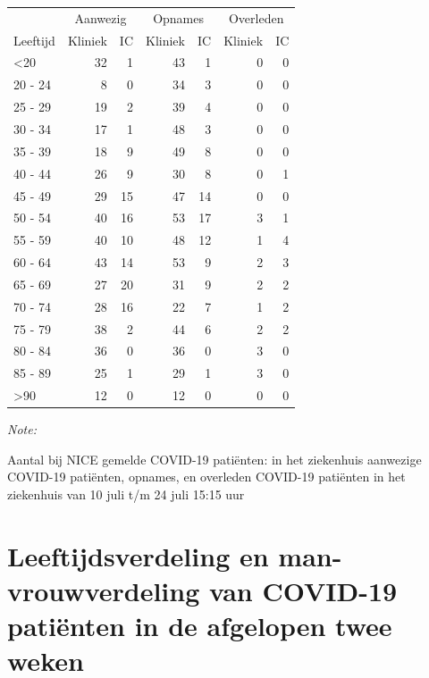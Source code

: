 \documentclass[
  english,
  man,floatsintext]{apa6}
\begin{document}
\begin{table}
\centering\begingroup\fontsize{10}{12}\selectfont

\begin{threeparttable}
\begin{tabular}{lrrrrrr}
\toprule
\multicolumn{1}{c}{ } & \multicolumn{2}{c}{Aanwezig} & \multicolumn{2}{c}{Opnames} & \multicolumn{2}{c}{Overleden} \\
\cmidrule(l{3pt}r{3pt}){2-3} \cmidrule(l{3pt}r{3pt}){4-5} \cmidrule(l{3pt}r{3pt}){6-7}
Leeftijd & Kliniek & IC & Kliniek & IC & Kliniek & IC\\
\midrule
<20 & 32 & 1 & 43 & 1 & 0 & 0\\
20 - 24 & 8 & 0 & 34 & 3 & 0 & 0\\
25 - 29 & 19 & 2 & 39 & 4 & 0 & 0\\
30 - 34 & 17 & 1 & 48 & 3 & 0 & 0\\
35 - 39 & 18 & 9 & 49 & 8 & 0 & 0\\
40 - 44 & 26 & 9 & 30 & 8 & 0 & 1\\
45 - 49 & 29 & 15 & 47 & 14 & 0 & 0\\
50 - 54 & 40 & 16 & 53 & 17 & 3 & 1\\
55 - 59 & 40 & 10 & 48 & 12 & 1 & 4\\
60 - 64 & 43 & 14 & 53 & 9 & 2 & 3\\
65 - 69 & 27 & 20 & 31 & 9 & 2 & 2\\
70 - 74 & 28 & 16 & 22 & 7 & 1 & 2\\
75 - 79 & 38 & 2 & 44 & 6 & 2 & 2\\
80 - 84 & 36 & 0 & 36 & 0 & 3 & 0\\
85 - 89 & 25 & 1 & 29 & 1 & 3 & 0\\
>90 & 12 & 0 & 12 & 0 & 0 & 0\\
\bottomrule
\end{tabular}
\begin{tablenotes}
\item \textit{Note: } 
\item Aantal bij NICE gemelde COVID-19 patiënten: in het ziekenhuis aanwezige COVID-19 patiënten, opnames, en overleden COVID-19 patiënten in het ziekenhuis van 10 juli t/m 24 juli 15:15 uur
\end{tablenotes}
\end{threeparttable}
\endgroup{}
\end{table}

\newpage

\hypertarget{leeftijdsverdeling-en-man-vrouwverdeling-van-covid-19-patiuxebnten-in-de-afgelopen-twee-weken}{%
\section{Leeftijdsverdeling en man-vrouwverdeling van COVID-19 patiënten in de afgelopen twee weken}\label{leeftijdsverdeling-en-man-vrouwverdeling-van-covid-19-patiuxebnten-in-de-afgelopen-twee-weken}}
\end{document}
